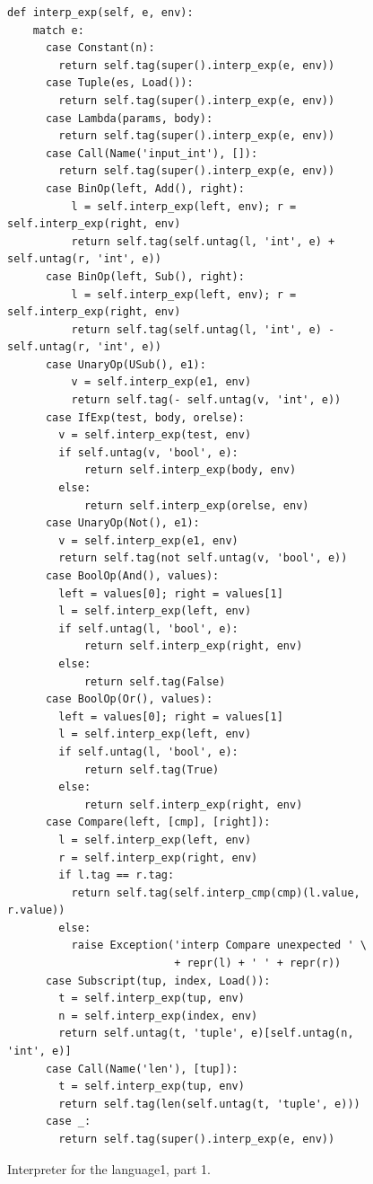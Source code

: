 \documentclass[7x10,nocrop]{TimesAPriori_MIT}%
\def\pythonEd{1}
\def\edition{0}
\newcommand{\python}[1]{{\if\edition\pythonEd #1\fi}}
\begin{document}
\begin{figure}[tbp]
{\begin{lstlisting}[basicstyle=\ttfamily\footnotesize]
  def interp_exp(self, e, env):
    match e:
      case Constant(n):
        return self.tag(super().interp_exp(e, env))
      case Tuple(es, Load()):
        return self.tag(super().interp_exp(e, env))
      case Lambda(params, body):
        return self.tag(super().interp_exp(e, env))
      case Call(Name('input_int'), []):
        return self.tag(super().interp_exp(e, env))
      case BinOp(left, Add(), right):
          l = self.interp_exp(left, env); r = self.interp_exp(right, env)
          return self.tag(self.untag(l, 'int', e) + self.untag(r, 'int', e))
      case BinOp(left, Sub(), right):
          l = self.interp_exp(left, env); r = self.interp_exp(right, env)
          return self.tag(self.untag(l, 'int', e) - self.untag(r, 'int', e))
      case UnaryOp(USub(), e1):
          v = self.interp_exp(e1, env)
          return self.tag(- self.untag(v, 'int', e))
      case IfExp(test, body, orelse):
        v = self.interp_exp(test, env)
        if self.untag(v, 'bool', e):
            return self.interp_exp(body, env)
        else:
            return self.interp_exp(orelse, env)
      case UnaryOp(Not(), e1):
        v = self.interp_exp(e1, env)
        return self.tag(not self.untag(v, 'bool', e))
      case BoolOp(And(), values):
        left = values[0]; right = values[1]
        l = self.interp_exp(left, env)
        if self.untag(l, 'bool', e):
            return self.interp_exp(right, env)
        else:
            return self.tag(False)
      case BoolOp(Or(), values):
        left = values[0]; right = values[1]
        l = self.interp_exp(left, env)
        if self.untag(l, 'bool', e):
            return self.tag(True)
        else:
            return self.interp_exp(right, env)
      case Compare(left, [cmp], [right]):
        l = self.interp_exp(left, env)
        r = self.interp_exp(right, env)
        if l.tag == r.tag:
          return self.tag(self.interp_cmp(cmp)(l.value, r.value))
        else:
          raise Exception('interp Compare unexpected ' \
                          + repr(l) + ' ' + repr(r))
      case Subscript(tup, index, Load()):
        t = self.interp_exp(tup, env)
        n = self.interp_exp(index, env)
        return self.untag(t, 'tuple', e)[self.untag(n, 'int', e)]
      case Call(Name('len'), [tup]):
        t = self.interp_exp(tup, env)
        return self.tag(len(self.untag(t, 'tuple', e)))
      case _:
        return self.tag(super().interp_exp(e, env))
\end{lstlisting}
\fi}
\caption{Interpreter for the \LangDyn{} language\python{, part 1}.}
\label{fig:interp-Ldyn}
\end{figure}
\end{document}
